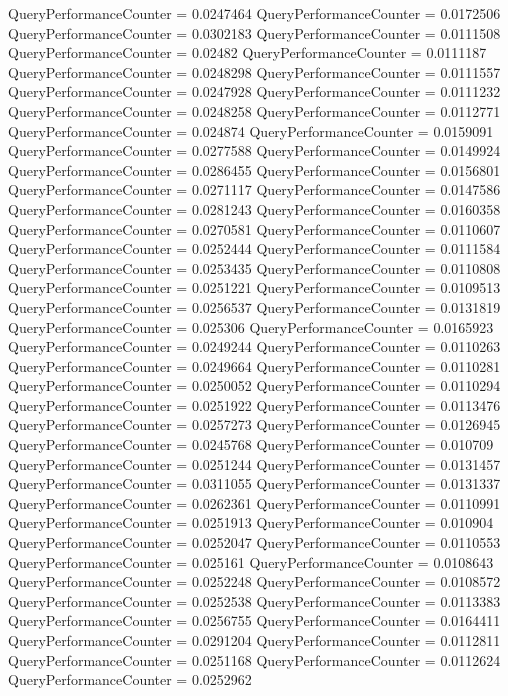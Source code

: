 \documentclass[9pt]{article}
\theoremstyle{plain}
\theoremstyle{definition}
\theoremstyle{remark}
\numberwithin{equation}{section}
\begin{document}
QueryPerformanceCounter  =  0.0247464
QueryPerformanceCounter  =  0.0172506
QueryPerformanceCounter  =  0.0302183
QueryPerformanceCounter  =  0.0111508
QueryPerformanceCounter  =  0.02482
QueryPerformanceCounter  =  0.0111187
QueryPerformanceCounter  =  0.0248298
QueryPerformanceCounter  =  0.0111557
QueryPerformanceCounter  =  0.0247928
QueryPerformanceCounter  =  0.0111232
QueryPerformanceCounter  =  0.0248258
QueryPerformanceCounter  =  0.0112771
QueryPerformanceCounter  =  0.024874
QueryPerformanceCounter  =  0.0159091
QueryPerformanceCounter  =  0.0277588
QueryPerformanceCounter  =  0.0149924
QueryPerformanceCounter  =  0.0286455
QueryPerformanceCounter  =  0.0156801
QueryPerformanceCounter  =  0.0271117
QueryPerformanceCounter  =  0.0147586
QueryPerformanceCounter  =  0.0281243
QueryPerformanceCounter  =  0.0160358
QueryPerformanceCounter  =  0.0270581
QueryPerformanceCounter  =  0.0110607
QueryPerformanceCounter  =  0.0252444
QueryPerformanceCounter  =  0.0111584
QueryPerformanceCounter  =  0.0253435
QueryPerformanceCounter  =  0.0110808
QueryPerformanceCounter  =  0.0251221
QueryPerformanceCounter  =  0.0109513
QueryPerformanceCounter  =  0.0256537
QueryPerformanceCounter  =  0.0131819
QueryPerformanceCounter  =  0.025306
QueryPerformanceCounter  =  0.0165923
QueryPerformanceCounter  =  0.0249244
QueryPerformanceCounter  =  0.0110263
QueryPerformanceCounter  =  0.0249664
QueryPerformanceCounter  =  0.0110281
QueryPerformanceCounter  =  0.0250052
QueryPerformanceCounter  =  0.0110294
QueryPerformanceCounter  =  0.0251922
QueryPerformanceCounter  =  0.0113476
QueryPerformanceCounter  =  0.0257273
QueryPerformanceCounter  =  0.0126945
QueryPerformanceCounter  =  0.0245768
QueryPerformanceCounter  =  0.010709
QueryPerformanceCounter  =  0.0251244
QueryPerformanceCounter  =  0.0131457
QueryPerformanceCounter  =  0.0311055
QueryPerformanceCounter  =  0.0131337
QueryPerformanceCounter  =  0.0262361
QueryPerformanceCounter  =  0.0110991
QueryPerformanceCounter  =  0.0251913
QueryPerformanceCounter  =  0.010904
QueryPerformanceCounter  =  0.0252047
QueryPerformanceCounter  =  0.0110553
QueryPerformanceCounter  =  0.025161
QueryPerformanceCounter  =  0.0108643
QueryPerformanceCounter  =  0.0252248
QueryPerformanceCounter  =  0.0108572
QueryPerformanceCounter  =  0.0252538
QueryPerformanceCounter  =  0.0113383
QueryPerformanceCounter  =  0.0256755
QueryPerformanceCounter  =  0.0164411
QueryPerformanceCounter  =  0.0291204
QueryPerformanceCounter  =  0.0112811
QueryPerformanceCounter  =  0.0251168
QueryPerformanceCounter  =  0.0112624
QueryPerformanceCounter  =  0.0252962
\end{document}
